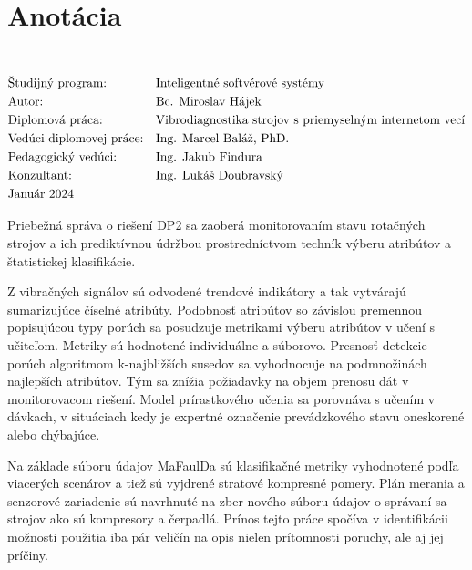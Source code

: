\section*{Anotácia}
\University \\
\uppercase{\Faculty}
\vspace{-8pt}
{\setlength{\mathindent}{0cm}
\begin{align*}
&\text{Študijný program:} && \text{\StudyProgramme} \\
&\text{Autor:} && \text{\Author} \\
&\text{\Thesis:} && \text{\Title} \\
&\text{Vedúci diplomovej práce:} && \text{\Supervisor} \\
&\text{Pedagogický vedúci:} && \text{\DepartmentalAdvisor} \\
&\text{Konzultant:} && \text{\Consultant} \\
&\text{\Date}
\end{align*}}

Priebežná správa o riešení DP2 sa zaoberá monitorovaním stavu rotačných strojov a ich prediktívnou údržbou prostredníctvom techník výberu atribútov a štatistickej klasifikácie.

Z vibračných signálov sú odvodené trendové indikátory a tak vytvárajú sumarizujúce číselné atribúty. Podobnosť atribútov so závislou premennou popisujúcou typy porúch sa posudzuje metrikami výberu atribútov v učení s učiteľom. Metriky sú hodnotené individuálne a súborovo. Presnosť detekcie porúch algoritmom k-najbližších susedov sa vyhodnocuje na podmnožinách najlepších atribútov. Tým sa znížia požiadavky na objem prenosu dát v monitorovacom riešení. Model prírastkového učenia sa porovnáva s učením v dávkach, v situáciach kedy je expertné označenie prevádzkového stavu oneskorené alebo chýbajúce.

Na základe súboru údajov MaFaulDa sú klasifikačné metriky vyhodnotené podľa viacerých scenárov a tiež sú vyjdrené stratové kompresné pomery. Plán merania a senzorové zariadenie sú navrhnuté na zber nového súboru údajov o správaní sa strojov ako sú kompresory a čerpadlá. Prínos tejto práce spočíva v identifikácii možnosti použitia iba pár veličín na opis nielen prítomnosti poruchy, ale aj jej príčiny.
\emptypage